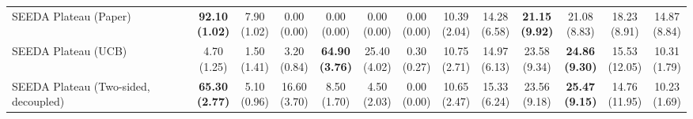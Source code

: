 \begin{table}[H]
{\begin{tabular}{l|cccccc|cccccc}
SEEDA Plateau (Paper) & \bfseries \makecell{92.10 \\ (1.02)} & \makecell{7.90 \\ (1.02)} & {\cellcolor[HTML]{C8E6C9}} \makecell{0.00 \\ (0.00)} & \makecell{0.00 \\ (0.00)} & \makecell{0.00 \\ (0.00)} & \makecell{0.00 \\ (0.00)} & \makecell{10.39 \\ (2.04)} & \makecell{14.28 \\ (6.58)} & {\cellcolor[HTML]{C8E6C9}} \bfseries \makecell{21.15 \\ (9.92)} & \makecell{21.08 \\ (8.83)} & \makecell{18.23 \\ (8.91)} & \makecell{14.87 \\ (8.84)} \\
SEEDA Plateau (UCB) & \makecell{4.70 \\ (1.25)} & \makecell{1.50 \\ (1.41)} & {\cellcolor[HTML]{C8E6C9}} \makecell{3.20 \\ (0.84)} & \bfseries \makecell{64.90 \\ (3.76)} & \makecell{25.40 \\ (4.02)} & \makecell{0.30 \\ (0.27)} & \makecell{10.75 \\ (2.71)} & \makecell{14.97 \\ (6.13)} & {\cellcolor[HTML]{C8E6C9}} \makecell{23.58 \\ (9.34)} & \bfseries \makecell{24.86 \\ (9.30)} & \makecell{15.53 \\ (12.05)} & \makecell{10.31 \\ (1.79)} \\
SEEDA Plateau (Two-sided, decoupled) & \bfseries \makecell{65.30 \\ (2.77)} & \makecell{5.10 \\ (0.96)} & {\cellcolor[HTML]{C8E6C9}} \makecell{16.60 \\ (3.70)} & \makecell{8.50 \\ (1.70)} & \makecell{4.50 \\ (2.03)} & \makecell{0.00 \\ (0.00)} & \makecell{10.65 \\ (2.47)} & \makecell{15.33 \\ (6.24)} & {\cellcolor[HTML]{C8E6C9}} \makecell{23.56 \\ (9.18)} & \bfseries \makecell{25.47 \\ (9.15)} & \makecell{14.76 \\ (11.95)} & \makecell{10.23 \\ (1.69)} \\

\end{tabular}}
\end{table}
